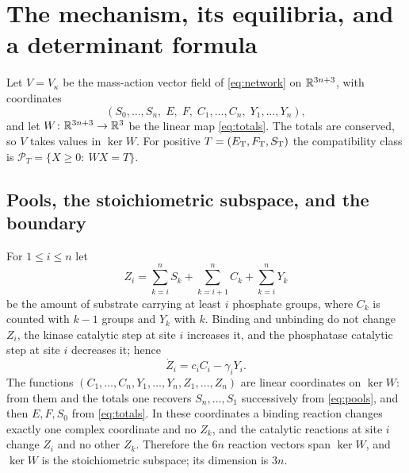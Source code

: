 \section{The mechanism, its equilibria, and a determinant formula}\label{sec:model}
Let \(V=V_\kappa\) be the mass-action vector field of \eqref{eq:network} on \(\mathbb R^{3n+3}\), with
coordinates
\[
 (S_0,\dots,S_n,\;E,\;F,\;C_1,\dots,C_n,\;Y_1,\dots,Y_n),
\]
and let \(W\colon\mathbb R^{3n+3}\to\mathbb R^3\) be the linear map \eqref{eq:totals}. The totals are
conserved, so \(V\) takes values in \(\ker W\). For positive \(T=(E_{\mathrm T},F_{\mathrm T},S_{\mathrm T})\) the
compatibility class is \(\mathcal P_T=\{X\ge0:\ WX=T\}\).

\subsection{Pools, the stoichiometric subspace, and the boundary}
For \(1\le i\le n\) let
\begin{equation}\label{eq:pools}
 Z_i=\sum_{k=i}^n S_k+\sum_{k=i+1}^n C_k+\sum_{k=i}^n Y_k
\end{equation}
be the amount of substrate carrying at least \(i\) phosphate groups, where \(C_k\) is counted
with \(k-1\) groups and \(Y_k\) with \(k\). Binding and unbinding do not change \(Z_i\), the
kinase catalytic step at site \(i\) increases it, and the phosphatase catalytic step at site
\(i\) decreases it; hence
\begin{equation}\label{eq:poolcurrent}
 \dot Z_i=c_iC_i-\gamma_iY_i .
\end{equation}
The functions \((C_1,\dots,C_n,Y_1,\dots,Y_n,Z_1,\dots,Z_n)\) are linear coordinates on
\(\ker W\): from them and the totals one recovers \(S_n,\dots,S_1\) successively from
\eqref{eq:pools}, and then \(E,F,S_0\) from \eqref{eq:totals}. In these coordinates a binding
reaction changes exactly one complex coordinate and no \(Z_k\), and the catalytic reactions at
site \(i\) change \(Z_i\) and no other \(Z_k\). Therefore the \(6n\) reaction vectors span
\(\ker W\), and \(\ker W\) is the stoichiometric subspace; its dimension is \(3n\).

